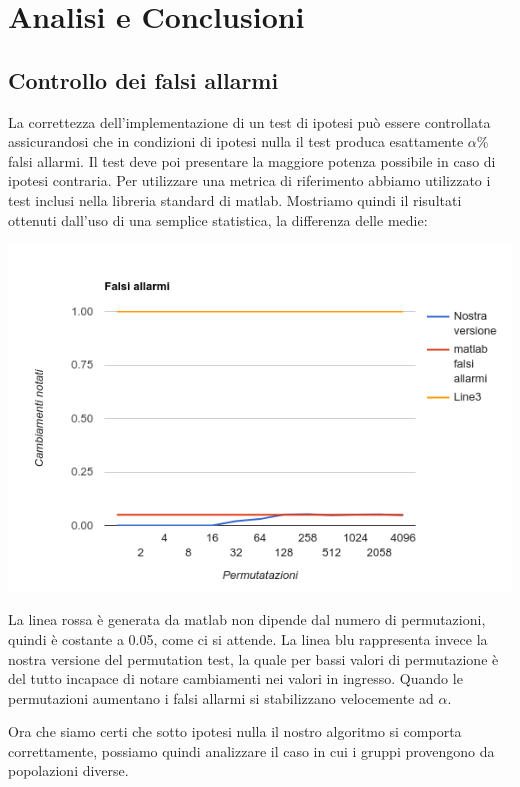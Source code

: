 \section{Analisi e Conclusioni}

\subsection{Controllo dei falsi allarmi}
La correttezza dell'implementazione di un test di ipotesi può essere controllata assicurandosi che in condizioni di ipotesi nulla il test produca esattamente $\alpha$\% falsi allarmi. Il test deve poi presentare la maggiore potenza possibile in caso di ipotesi contraria. Per utilizzare una metrica di riferimento abbiamo utilizzato i test inclusi nella libreria standard di matlab.
Mostriamo quindi il risultati ottenuti dall'uso di una semplice statistica, la differenza delle medie:

\includegraphics[width=\linewidth]{falsi_allarmi}

La linea rossa è generata da matlab non dipende dal numero di permutazioni, quindi è costante a 0.05, come ci si attende. La linea blu rappresenta invece la nostra versione del permutation test, la quale per bassi valori di permutazione è del tutto incapace di notare cambiamenti nei valori in ingresso. Quando le permutazioni aumentano i falsi allarmi si stabilizzano velocemente ad $\alpha$. 

Ora che siamo certi che sotto ipotesi nulla il nostro algoritmo si comporta correttamente, possiamo quindi analizzare il caso in cui i gruppi provengono da popolazioni diverse.

